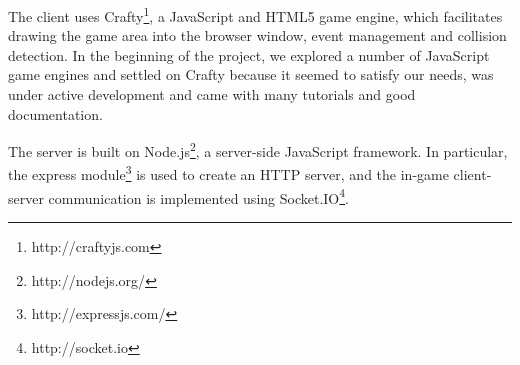 The client uses Crafty\footnote{http://craftyjs.com}, a JavaScript and
HTML5 game engine, which facilitates drawing the game area into the
browser window, event management and collision detection. In the
beginning of the project, we explored a number of JavaScript game
engines and settled on Crafty because it seemed to satisfy our needs,
was under active development and came with many tutorials and good
documentation.



The server is built on Node.js\footnote{http://nodejs.org/}, a
server-side JavaScript framework. In particular, the express
module\footnote{http://expressjs.com/} is used to create an HTTP
server, and the in-game client-server communication is implemented
using Socket.IO\footnote{http://socket.io}.





